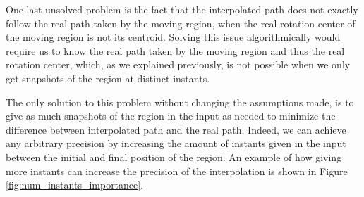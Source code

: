 One last unsolved problem is the fact that the interpolated path does not exactly follow the real path taken by the moving region, when the real rotation center of the moving region is not its centroid. Solving this issue algorithmically would require us to know the real path taken by the moving region and thus the real rotation center, which, as we explained previously, is not possible when we only get snapshots of the region at distinct instants. 

The only solution to this problem without changing the assumptions made, is to give as much snapshots of the region in the input as needed to minimize the difference between interpolated path and the real path. Indeed, we can achieve any arbitrary precision by increasing the amount of instants given in the input between the initial and final position of the region. An example of how giving more instants can increase the precision of the interpolation is shown in Figure \ref{fig:num_instants_importance}. \\

